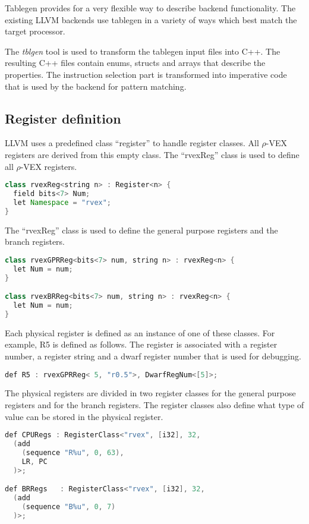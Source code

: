 Tablegen provides for a very flexible way to describe backend functionality. The existing LLVM backends use tablegen in a variety of ways which best match the target processor. 

The \emph{tblgen} tool is used to transform the tablegen input files into C++. The resulting C++ files contain enums, structs and arrays that describe the properties. The instruction selection part is transformed into imperative code that is used by the backend for pattern matching. 

\subsection{Register definition}
LLVM uses a predefined class “register” to handle register classes. All $\rho$-VEX registers are derived from this empty class. The “rvexReg” class is used to define all $\rho$-VEX registers. 

\begin{lstlisting}[language=java]
class rvexReg<string n> : Register<n> {
  field bits<7> Num;
  let Namespace = "rvex";
}
\end{lstlisting}

The “rvexReg” class is used to define the general purpose registers and the branch registers.
\begin{lstlisting}[language=java]
class rvexGPRReg<bits<7> num, string n> : rvexReg<n> {
  let Num = num;
}

class rvexBRReg<bits<7> num, string n> : rvexReg<n> {
  let Num = num;
}
\end{lstlisting}

Each physical register is defined as an instance of one of these classes. For example, R5 is defined as follows. The register is associated with a register number, a register string and a dwarf register number that is used for debugging.

\begin{lstlisting}[language=java]
def R5 : rvexGPRReg< 5, "r0.5">, DwarfRegNum<[5]>;
\end{lstlisting}

The physical registers are divided in two register classes for the general purpose registers and for the branch registers. The register classes also define what type of value can be stored in the physical register.

\begin{lstlisting}[language=java]
def CPURegs : RegisterClass<"rvex", [i32], 32, 
  (add
    (sequence "R%u", 0, 63),
    LR, PC
  )>;

def BRRegs   : RegisterClass<"rvex", [i32], 32, 
  (add 
    (sequence "B%u", 0, 7)
  )>;
\end{lstlisting}

